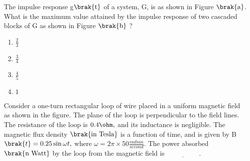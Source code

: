 \bigskip
\item The impulse response g$\brak{\text{t}}$ of a system, G, is as shown in Figure $\brak{\text{a}}$. What is the maximum value attained by the impulse response of two cascaded blocks of G as shown in Figure $\brak{\text{b}}$ ?
\begin{figure}[!ht]
\centering
{}%


\end{figure}
\begin{multicols}{4}
    \begin{enumerate}
        \item $\frac{2}{3}$
        \item $\frac{3}{4}$
        \item $\frac{4}{5}$
        \item $1$
    \end{enumerate}
\end{multicols}
\bigskip
\item Consider a one-turn rectangular loop of wire placed in a uniform magnetic field as shown in the figure. The plane of the loop is perpendicular to the field lines. The resistance of the loop is $0.4\ohm,$ and its inductance is negligible. The magnetic flux density $\brak{\text{in Tesla}}$ is a function of time, and is given by B$\brak{t}=0.25\sin\omega t,$ where $\omega=2\pi\times50\frac{radian}{second}.$ The power absorbed $\brak{\text{n Watt}}$ by the loop from the magnetic field is $\underline{\hspace{2cm}}.$

